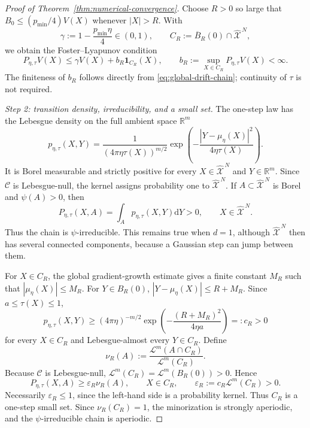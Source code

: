 \documentclass[11pt]{article}
\def\R{\mathbb{R}}
\def\Xc{{\mathcal X}}
\def\id{\mathbf{1}}
\def\hX{\widehat{\Xc}^{\,N}}
\newcommand{\dd}{\mathrm{d}}
\newcommand{\Leb}{\mathcal L}
\newcommand{\Coll}{\mathscr C}
\newcommand{\pmin}{p_{\min}}
\theoremstyle{definition}
\theoremstyle{remark}
\numberwithin{equation}{section}
\begin{document}
\begin{proof}[Proof of Theorem~\ref{thm:numerical-convergence}]
Choose $R>0$ so large that
$B_0\le(\pmin/4)V(X)$ whenever $|X|>R$.  With
\begin{equation}\label{eq:gamma-chain-detailed}
 \gamma:=1-\frac{\pmin\eta}{4}\in(0,1),
 \qquad
 C_R:=\overline B_R(0)\cap\hX,
\end{equation}
we obtain the Foster--Lyapunov condition
\begin{equation}\label{eq:drift-small-set}
 P_{\eta,\tau}V(X)
 \le\gamma V(X)+b_R\id_{C_R}(X),
 \qquad
 b_R:=\sup_{X\in C_R}P_{\eta,\tau}V(X)<\infty.
\end{equation}
The finiteness of $b_R$ follows directly from \eqref{eq:global-drift-chain}; continuity of $\tau$
is not required.

\smallskip
\noindent\textit{Step 2: transition density, irreducibility, and a small set.}
The one-step law has the Lebesgue density on the full ambient space $\R^m$
\begin{equation}\label{eq:transition-density-chain}
 p_{\eta,\tau}(X,Y)
 =\frac1{(4\pi\eta\tau(X))^{m/2}}
 \exp\left(-\frac{|Y-\mu_\eta(X)|^2}{4\eta\tau(X)}\right).
\end{equation}
It is Borel measurable and strictly positive for every $X\in\hX$ and $Y\in\R^m$.  Since
$\Coll$ is Lebesgue-null, the kernel assigns probability one to $\hX$.  If
$A\subset\hX$ is Borel and $\psi(A)>0$, then
\[
 P_{\eta,\tau}(X,A)
 =\int_Ap_{\eta,\tau}(X,Y)\dd Y>0,
 \qquad X\in\hX.
\]
Thus the chain is $\psi$-irreducible.  This remains true when $d=1$, although $\hX$ then has
several connected components, because a Gaussian step can jump between them.

For $X\in C_R$, the global gradient-growth estimate gives a finite constant $M_R$ such that
$|\mu_\eta(X)|\le M_R$.  For $Y\in B_R(0)$,
$|Y-\mu_\eta(X)|\le R+M_R$.  Since $a\le\tau(X)\le1$,
\begin{equation}\label{eq:explicit-density-lower-chain}
 p_{\eta,\tau}(X,Y)
 \ge (4\pi\eta)^{-m/2}
 \exp\left(-\frac{(R+M_R)^2}{4\eta a}\right)
 =:c_R>0
\end{equation}
for every $X\in C_R$ and Lebesgue-almost every $Y\in C_R$.  Define
\[
 \nu_R(A):=\frac{\Leb^m(A\cap C_R)}{\Leb^m(C_R)}.
\]
Because $\Coll$ is Lebesgue-null,
$\Leb^m(C_R)=\Leb^m(B_R(0))>0$.  Hence
\begin{equation}\label{eq:minorization-chain}
 P_{\eta,\tau}(X,A)\ge\varepsilon_R\nu_R(A),
 \qquad X\in C_R,
 \qquad
 \varepsilon_R:=c_R\Leb^m(C_R)>0.
\end{equation}
Necessarily $\varepsilon_R\le1$, since the left-hand side is a probability kernel.  Thus $C_R$ is a
one-step small set.  Since $\nu_R(C_R)=1$, the minorization is strongly aperiodic, and the
$\psi$-irreducible chain is aperiodic.


\end{proof}
\end{document}
